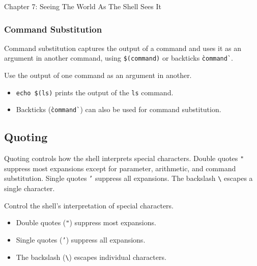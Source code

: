 \begin{notes}{Chapter 7: Seeing The World As The Shell Sees It}
\begin{highlight}
    \end{highlight}
    
    \subsubsection*{Command Substitution}
    
    Command substitution captures the output of a command and uses it as an argument in another command, using \texttt{\$(command)} or backticks \texttt{\`command\`}.
    
    \begin{highlight}
    
    Use the output of one command as an argument in another.
    
    \begin{itemize}
        \item \texttt{echo \$(ls)} prints the output of the \texttt{ls} command.
        \item Backticks (\texttt{\`command\`}) can also be used for command substitution.
    \end{itemize}
    
    \end{highlight}
    
    \subsection*{Quoting}
    
    Quoting controls how the shell interprets special characters. Double quotes \texttt{"} suppress most expansions except for parameter, arithmetic, and command substitution. Single quotes \texttt{'} 
    suppress all expansions. The backslash \texttt{\textbackslash} escapes a single character.
    
    \begin{highlight}[Quoting]
    
    Control the shell's interpretation of special characters.
    
    \begin{itemize}
        \item Double quotes (\texttt{"}) suppress most expansions.
        \item Single quotes (\texttt{'}) suppress all expansions.
        \item The backslash (\texttt{\textbackslash}) escapes individual characters.
    \end{itemize}
    

\end{highlight}
\end{notes}
